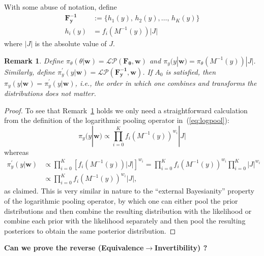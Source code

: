 \documentclass[11pt]{article}
\newtheorem{rmk}{Remark}[]
\begin{document}
With some abuse of notation, define
  \begin{align}
  \label{eq:transfF}
  \mathbf{F^{-1}_y} &:= \{h_1(y), \, h_2(y), \ldots, \, h_K(y) \} \\
  h_i(y) & = f_i(M^{-1}(y))|J|\nonumber
  \end{align}
where $|J|$ is the absolute value of $J$.
\begin{rmk}
\label{rmk:invariance}
Define $\pi_{\theta}(\theta | \mathbf{w}) =  \mathcal{LP}(\mathbf{F_\theta}, \mathbf{w})$ and $\pi_{y}(y |\mathbf{w}) = \pi_{\theta}(M^{-1}(y))|J|$.
Similarly, define $\pi^{\prime}_{y}(y|\mathbf{w}) = \mathcal{LP}(\mathbf{F^{-1}_y}, \mathbf{w})$.
If $A_0$ is satisfied, then $\pi_{y}(y |\mathbf{w}) = \pi^{\prime}_{y}(y|\mathbf{w})$, i.e., the order in which one combines and transforms the distributions does not matter.
\end{rmk}
\begin{proof}
To see that Remark~\ref{rmk:invariance} holds we only need a straightforward calculation from the definition of the logarithmic pooling operator in~(\ref{eq:logpool}):
\[\pi_{y}(y |\mathbf{w}) \propto \prod_{i=0}^K f_i(M^{-1}(y))^{w_i}|J| \]
whereas
\begin{align*}
 \pi^{\prime}_{y}(y|\mathbf{w}) &\propto  \prod_{i=0}^K \left[ f_i(M^{-1}(y))|J| \right] ^{w_i} = \prod_{i=0}^K f_i(M^{-1}(y))^{w_i} \prod_{i=0}^K|J|^{w_i}\\
 &\propto  \prod_{i=0}^K f_i(M^{-1}(y))^{w_i}|J|, %
\end{align*}
as claimed.
This is very similar in nature to the ``external Bayesianity'' property of the logarithmic pooling operator, by which one can either pool the prior distributions and then combine the resulting distribution with the likelihood or combine each prior with the likelihood separately and then pool the resulting posteriors to obtain the same posterior distribution.
\end{proof}

\textbf{\large Can we prove the reverse (Equivalence$\to$Invertibility) ?}
\end{document}
